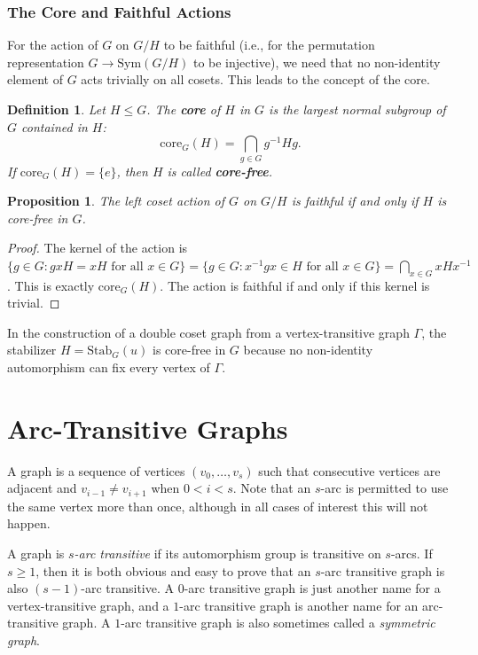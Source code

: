 \documentclass[12pt,a4paper,openany]{book}
\newtheorem{definition}{Definition}[section]
\newtheorem{proposition}{Proposition}[section]
\begin{document}
\subsection*{The Core and Faithful Actions}

For the action of $G$ on $G/H$ to be faithful (i.e., for the permutation representation $G \to \mathrm{Sym}(G/H)$ to be injective), we need that no non-identity element of $G$ acts trivially on all cosets. This leads to the concept of the core.

\begin{definition}
Let $H \le G$. The \textbf{core} of $H$ in $G$ is the largest normal subgroup of $G$ contained in $H$:
\[
\mathrm{core}_G(H) = \bigcap_{g \in G} g^{-1} H g.
\]
If $\mathrm{core}_G(H) = \{e\}$, then $H$ is called \textbf{core-free}.
\end{definition}

\begin{proposition}
The left coset action of $G$ on $G/H$ is faithful if and only if $H$ is core-free in $G$.
\end{proposition}
\begin{proof}
The kernel of the action is $\{ g \in G : gxH = xH \text{ for all } x \in G \} = \{ g \in G : x^{-1}gx \in H \text{ for all } x \in G \} = \bigcap_{x \in G} x H x^{-1}$. This is exactly $\mathrm{core}_G(H)$. The action is faithful if and only if this kernel is trivial.
\end{proof}

In the construction of a double coset graph from a vertex-transitive graph $\Gamma$, the stabilizer $H = \mathrm{Stab}_G(u)$ is core-free in $G$ because no non-identity automorphism can fix every vertex of $\Gamma$.




\chapter{Arc-Transitive Graphs}

A graph is a sequence of vertices $(v_0, \ldots, v_s)$ such that consecutive vertices are adjacent and $v_{i-1} \neq v_{i+1}$ when $0 < i < s$. Note that an $s$-arc is permitted to use the same vertex more than once, although in all cases of interest this will not happen. 

A graph is \emph{$s$-arc transitive} if its automorphism group is transitive on $s$-arcs. If $s \geq 1$, then it is both obvious and easy to prove that an $s$-arc transitive graph is also $(s - 1)$-arc transitive. A $0$-arc transitive graph is just another name for a vertex-transitive graph, and a $1$-arc transitive graph is another name for an arc-transitive graph. A $1$-arc transitive graph is also sometimes called a \emph{symmetric graph}.
\end{document}
